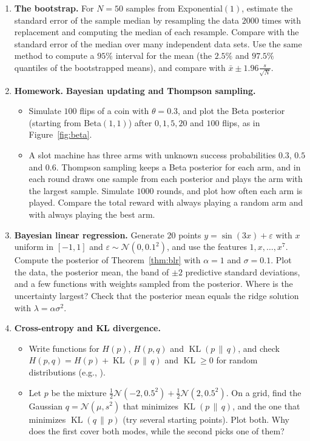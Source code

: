 \documentclass[11pt]{article}
\newcommand{\homework}{\textcolor{red!70!black}{\textbf{Homework.}}}
\newcommand{\py}[1]{\texttt{\detokenize{#1}}}
\DeclareMathOperator{\KL}{KL}
\theoremstyle{definition}
\theoremstyle{plain}
\theoremstyle{remark}
\begin{document}
\begin{enumerate}[label=\textbf{P\arabic*.}, leftmargin=*]
    \item \textbf{The bootstrap.} For $N = 50$ samples from Exponential$(1)$, estimate the standard error of the sample median by resampling the data $2000$ times with replacement and computing the median of each resample. Compare with the standard error of the median over many independent data sets. Use the same method to compute a $95\%$ interval for the mean (the $2.5\%$ and $97.5\%$ quantiles of the bootstrapped means), and compare with $\bar x \pm 1.96\frac{s}{\sqrt{N}}$.

    \item \homework{} \textbf{Bayesian updating and Thompson sampling.}
    \begin{itemize}
        \item Simulate $100$ flips of a coin with $\theta = 0.3$, and plot the Beta posterior (starting from Beta$(1, 1)$) after $0, 1, 5, 20$ and $100$ flips, as in Figure~\ref{fig:beta}.
        \item A slot machine has three arms with unknown success probabilities $0.3$, $0.5$ and $0.6$. Thompson sampling keeps a Beta posterior for each arm, and in each round draws one sample from each posterior and plays the arm with the largest sample. Simulate $1000$ rounds, and plot how often each arm is played. Compare the total reward with always playing a random arm and with always playing the best arm.
    \end{itemize}

    \item \textbf{Bayesian linear regression.} Generate $20$ points $y = \sin(3x) + \varepsilon$ with $x$ uniform in $[-1, 1]$ and $\varepsilon \sim \mathcal{N}(0, 0.1^2)$, and use the features $1, x, \ldots, x^7$. Compute the posterior of Theorem~\ref{thm:blr} with $\alpha = 1$ and $\sigma = 0.1$. Plot the data, the posterior mean, the band of $\pm 2$ predictive standard deviations, and a few functions with weights sampled from the posterior. Where is the uncertainty largest? Check that the posterior mean equals the ridge solution with $\lambda = \alpha\sigma^2$.

    \item \textbf{Cross-entropy and KL divergence.}
    \begin{itemize}
        \item Write functions for $H(p)$, $H(p, q)$ and $\KL(p \,\|\, q)$, and check $H(p, q) = H(p) + \KL(p \,\|\, q)$ and $\KL \geq 0$ for random distributions (e.g., \py{rng.dirichlet(np.ones(5))}).
        \item Let $p$ be the mixture $\frac{1}{2}\mathcal{N}(-2, 0.5^2) + \frac{1}{2}\mathcal{N}(2, 0.5^2)$. On a grid, find the Gaussian $q = \mathcal{N}(\mu, s^2)$ that minimizes $\KL(p \,\|\, q)$, and the one that minimizes $\KL(q \,\|\, p)$ (try several starting points). Plot both. Why does the first cover both modes, while the second picks one of them?
    \end{itemize}


\end{enumerate}
\end{document}
